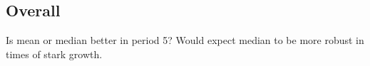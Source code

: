 \subsection{Overall}
Is mean or median better in period 5? Would expect median to be more robust in times of stark growth.
